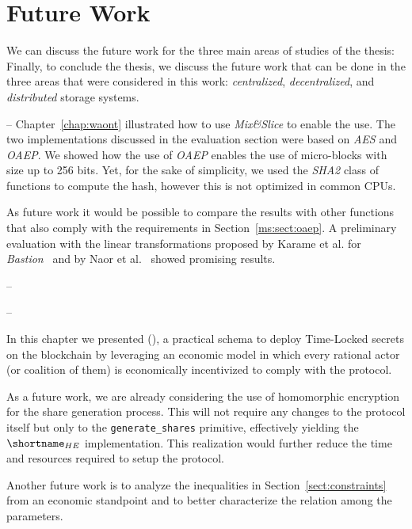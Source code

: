 {	

\section{Future Work}

We can discuss the future work for the three main areas of studies of the thesis: 
Finally, to conclude the thesis, we discuss the future work that can be done in the three areas that were considered in this work: \textit{centralized}, \textit{decentralized}, and \textit{distributed} storage systems.

\begin{description}
	
	\item[Centralized storage systems] -- Chapter~\ref{chap:waont} illustrated how to use {\em Mix\&Slice} to enable the use. The two implementations discussed in the evaluation section were based on \textit{AES} and \textit{OAEP}. We showed how the use of \textit{OAEP} enables the use of micro-blocks with size up to 256 bits. Yet, for the sake of simplicity, we used the 	 \textit{SHA2} class of functions to compute the hash, however this is not optimized in common CPUs.
	
	As future work it would be possible to compare the results with other functions that also comply with the requirements in Section~\ref{ms:sect:oaep}. A preliminary evaluation with the linear transformations proposed by Karame et al. for \textit{Bastion}~\cite{bastion} and by Naor et al.~\cite{Naor1999} showed promising results.
	
	\item[Decentralized storage systems] --
	
	\item[Distributed storage systems] --
		\item In this chapter we presented \name (\shortname), a practical schema to deploy Time-Locked secrets on the blockchain by leveraging an economic model in which every rational actor (or coalition of them) is economically incentivized to comply with the protocol.
		\item As a future work, we are already considering the use of homomorphic encryption for the share generation process. This will not require any changes to the protocol itself but only to the \texttt{generate\_shares} primitive, effectively yielding the $\shortname_{HE}$ implementation. This realization would further reduce the time and resources required to setup the \shortname protocol.
		\item Another future work is to analyze the inequalities in Section~\ref{sect:constraints} from an economic standpoint and to better characterize the relation among the parameters.
	
\end{description}

}